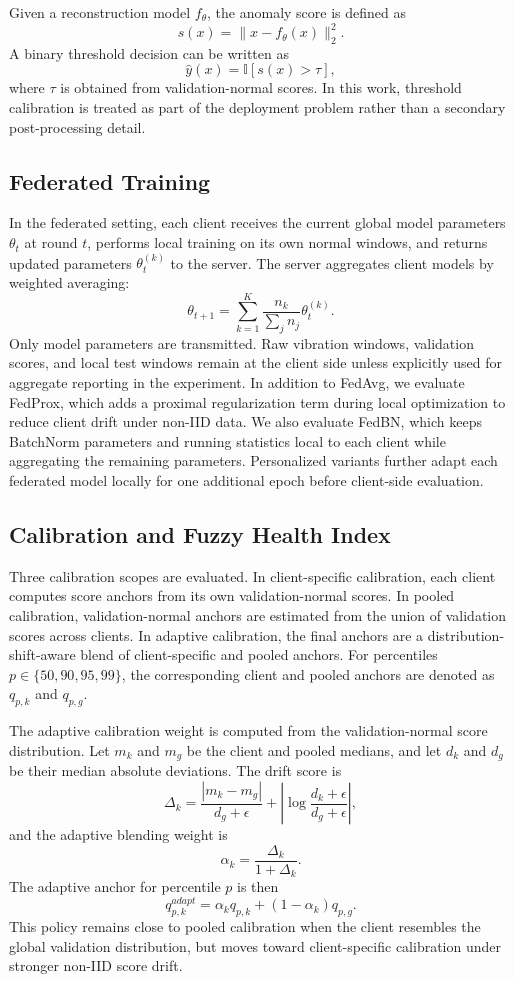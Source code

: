 \documentclass[11pt]{article}
\begin{document}
Given a reconstruction model $f_\theta$, the anomaly score is defined as
\[
s(x)=\|x-f_\theta(x)\|_2^2.
\]
A binary threshold decision can be written as
\[
\hat{y}(x)=\mathbb{I}[s(x)>\tau],
\]
where $\tau$ is obtained from validation-normal scores. In this work, threshold calibration is treated as part of the deployment problem rather than a secondary post-processing detail.

\subsection{Federated Training}

In the federated setting, each client receives the current global model parameters $\theta_t$ at round $t$, performs local training on its own normal windows, and returns updated parameters $\theta_t^{(k)}$ to the server. The server aggregates client models by weighted averaging:
\[
\theta_{t+1}=\sum_{k=1}^{K}\frac{n_k}{\sum_j n_j}\theta_t^{(k)}.
\]
Only model parameters are transmitted. Raw vibration windows, validation scores, and local test windows remain at the client side unless explicitly used for aggregate reporting in the experiment. In addition to FedAvg, we evaluate FedProx, which adds a proximal regularization term during local optimization to reduce client drift under non-IID data. We also evaluate FedBN, which keeps BatchNorm parameters and running statistics local to each client while aggregating the remaining parameters. Personalized variants further adapt each federated model locally for one additional epoch before client-side evaluation.

\subsection{Calibration and Fuzzy Health Index}

Three calibration scopes are evaluated. In client-specific calibration, each client computes score anchors from its own validation-normal scores. In pooled calibration, validation-normal anchors are estimated from the union of validation scores across clients. In adaptive calibration, the final anchors are a distribution-shift-aware blend of client-specific and pooled anchors. For percentiles $p\in\{50,90,95,99\}$, the corresponding client and pooled anchors are denoted as $q_{p,k}$ and $q_{p,g}$.

The adaptive calibration weight is computed from the validation-normal score distribution. Let $m_k$ and $m_g$ be the client and pooled medians, and let $d_k$ and $d_g$ be their median absolute deviations. The drift score is
\[
\Delta_k=\frac{|m_k-m_g|}{d_g+\epsilon}+\left|\log\frac{d_k+\epsilon}{d_g+\epsilon}\right|,
\]
and the adaptive blending weight is
\[
\alpha_k=\frac{\Delta_k}{1+\Delta_k}.
\]
The adaptive anchor for percentile $p$ is then
\[
q_{p,k}^{adapt}=\alpha_k q_{p,k}+(1-\alpha_k)q_{p,g}.
\]
This policy remains close to pooled calibration when the client resembles the global validation distribution, but moves toward client-specific calibration under stronger non-IID score drift.
\end{document}
